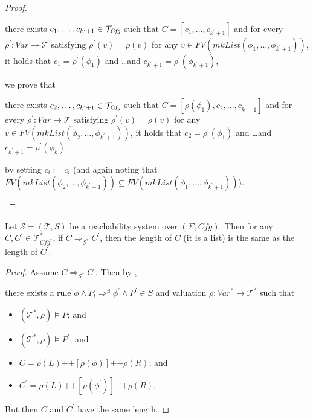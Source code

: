\begin{proof}
\begin{itemize}
\begin{itemize}
        \begin{proofenv}
        there exists $c_1, \ldots, c_{k^\prime + 1} \in \mathcal{T}_{\mathit{Cfg}}$ such that $C = [c_1, \ldots, c_{k^\prime + 1}]$
        and for every $\rho^\prime : \mathit{Var} \to \mathcal{T}$ satisfying
        $\rho^\prime(v) = \rho(v)$ for any
        $v \in \mathit{FV}(\mathit{mkList}(\phi_1, \ldots, \phi_{k^\prime + 1}))$,
        it holds that
        $c_1 = \rho^\prime(\phi_1)$ and \ldots and $c_{k^\prime + 1} = \rho^\prime(\phi_{k^\prime + 1})$,
        \end{proofenv}
        we prove that
        \begin{proofenv}
        there exists $c_2, \ldots, c_{k^\prime + 1} \in \mathcal{T}_{\mathit{Cfg}}$ such that
        $C = [\rho(\phi_1), c_2, \ldots, c_{k^\prime+1}]$
        and for every $\rho^\prime : \mathit{Var} \to \mathcal{T}$ satisfying
        $\rho^\prime(v) = \rho(v)$ for any
        $v \in \mathit{FV}(\mathit{mkList}(\phi_2, \ldots, \phi_{k^\prime+1}))$,
        it holds that
        $c_2 = \rho^\prime(\phi_1)$ and \ldots and $c_{k^\prime+1} = \rho^\prime(\phi_k)$
        \end{proofenv}
        by setting $c_i := c_i$
        (and again noting that $\mathit{FV}(\mathit{mkList}(\phi_2,\ldots,\phi_{k^\prime+1})) \subseteq \mathit{FV}(\mathit{mkList}(\phi_1,\ldots,\phi_{k^\prime+1}))$).
    \end{itemize}
\end{itemize}
\end{proof}

\begin{lemma}\label{lem:transitionOnlyBetweenListsOfSameLength}
    Let $\mathcal{S} = (\mathcal{T}, S)$ be a reachability system over $(\Sigma, \mathit{Cfg})$.
    Then for any $C,C^\prime \in \mathcal{T}^*_{\mathit{Cfg}^*}$,
    if $C \Rightarrow_{\mathcal{S}^*} C^\prime$,
    then the length of $C$ (it is a list) is the same as the length of $C^\prime$.
\end{lemma}
\begin{proof}
Assume $C \Rightarrow_{\mathcal{S}^*} C^\prime$.
Then by ,
\begin{proofenv}
    there exists a rule $\phi \land P_l \Rightarrow^\exists \phi^\prime \land P^\prime \in S$
    and valuation $\rho : \mathit{Var}^* \to \mathcal{T}^*$ such that
    \begin{itemize}
        \item $(\mathcal{T}^*, \rho) \vDash P$; and
        \item $(\mathcal{T}^*, \rho) \vDash P^\prime$; and
        \item $C = \rho(L) \texttt{++} [\rho(\phi)] \texttt{++} \rho(R)$; and
        \item $C^\prime = \rho(L) \texttt{++} [\rho(\phi^\prime)] 
        \texttt{++} \rho(R)$.
    \end{itemize}
\end{proofenv}
But then $C$ and $C^\prime$ have the same length.
\end{proof}

